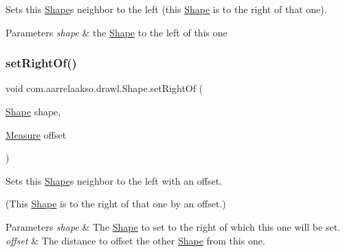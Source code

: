 Sets this \hyperlink{classcom_1_1aarrelaakso_1_1drawl_1_1_shape}{Shape}\textquotesingle{}s neighbor to the left (this \hyperlink{classcom_1_1aarrelaakso_1_1drawl_1_1_shape}{Shape} is to the right of that one). 


\begin{DoxyParams}{Parameters}
{\em shape} & the \hyperlink{classcom_1_1aarrelaakso_1_1drawl_1_1_shape}{Shape} to the left of this one \\
\hline
\end{DoxyParams}
\mbox{\label{classcom_1_1aarrelaakso_1_1drawl_1_1_shape_a5bdc7b20e5863cf6c83a8abe57ce1399}} 
\subsubsection{\texorpdfstring{set\+Right\+Of()}{setRightOf()}\hspace{0.1cm}{\footnotesize\ttfamily [2/2]}}
{\footnotesize\ttfamily void com.\+aarrelaakso.\+drawl.\+Shape.\+set\+Right\+Of (\begin{DoxyParamCaption}\item[{\hyperlink{classcom_1_1aarrelaakso_1_1drawl_1_1_shape}{Shape}}]{shape,  }\item[{\hyperlink{classcom_1_1aarrelaakso_1_1drawl_1_1_measure}{Measure}}]{offset }\end{DoxyParamCaption})\hspace{0.3cm}{\ttfamily [inherited]}}



Sets this \hyperlink{classcom_1_1aarrelaakso_1_1drawl_1_1_shape}{Shape}\textquotesingle{}s neighbor to the left with an offset. 

(This \hyperlink{classcom_1_1aarrelaakso_1_1drawl_1_1_shape}{Shape} is to the right of that one by an offset.)


\begin{DoxyParams}{Parameters}
{\em shape} & The \hyperlink{classcom_1_1aarrelaakso_1_1drawl_1_1_shape}{Shape} to set to the right of which this one will be set. \\
\hline
{\em offset} & The distance to offset the other \hyperlink{classcom_1_1aarrelaakso_1_1drawl_1_1_shape}{Shape} from this one. \\
\hline
\end{DoxyParams}
\mbox{\label{classcom_1_1aarrelaakso_1_1drawl_1_1_text_a03668d250e9a1e99b9fa9214fdc40856}} 
